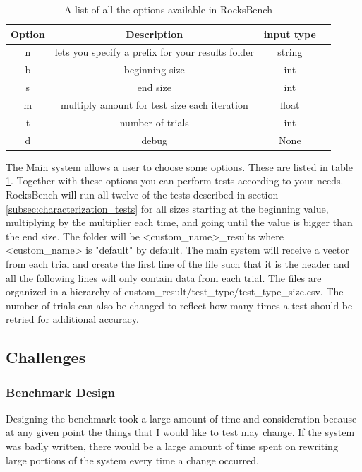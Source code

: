 \documentclass[twocolumn,11pt]{article}
\begin{document}
\begin{table}[h!]
  \begin{tabular}{ |c|c|c|c| }
    \hline
    Option & Description & input type \\
    \hline \hline
    n & lets you specify a prefix for your results folder & string \\ \hline
    b & beginning size & int \\ \hline
    s & end size & int \\ \hline
    m & multiply amount for test size each iteration & float \\ \hline
    t & number of trials & int \\ \hline
    d & debug & None \\ \hline
  \end{tabular}
  \caption{A list of all the options available in RocksBench}
  \label{tab:RocksBench_options}
\end{table}

The Main system allows a user to choose some options. These are listed in table
\ref{tab:RocksBench_options}. Together with these options you can perform tests
according to your needs. RocksBench will run all twelve of the tests described
in section \ref{subsec:characterization_tests} for all sizes starting at the
beginning value, multiplying by the multiplier each time, and going until the
value is bigger than the end size. The folder will be <custom\_name>\_results
where <custom\_name> is "default" by default. The main system will receive a
vector from each trial and create the first line of the file such that it is the
header and all the following lines will only contain data from each trial. The
files are organized in a hierarchy of
custom\_result/test\_type/test\_type\_size.csv. The number of trials can also be
changed to reflect how many times a test should be retried for additional
accuracy.

\subsection{Challenges}

\subsubsection{Benchmark Design}

Designing the benchmark took a large amount of time and consideration because at
any given point the things that I would like to test may change. If the system
was badly written, there would be a large amount of time spent on rewriting
large portions of the system every time a change occurred.
\end{document}
